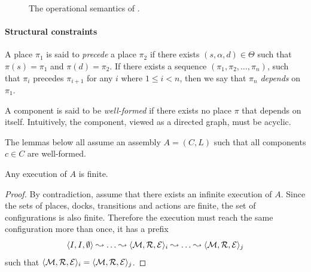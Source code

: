 {\begin{figure}[tp]
  \caption{The operational semantics of \mad.}
  \label{fig:rules}
\end{figure}


\paragraph{Structural constraints}{
  A place $\pi_1$ is said to \emph{precede} a place $\pi_2$ if there
  exists $(s, \alpha, d) \in \Theta$ such that $\pi(s) = \pi_1$ and
  $\pi(d) = \pi_2$.  If there exists a sequence $(\pi_1, \pi_2, \dots,
  \pi_n)$, such that $\pi_{i}$ precedes $\pi_{i+1}$ for any $i$ where
  $1 \le i < n$, then we say that $\pi_n$ \emph{depends} on $\pi_1$.

  A \mad component is said to be \emph{well-formed} if there exists no
  place $\pi$ that depends on itself. Intuitively, the component,
  viewed as a directed graph, must be acyclic.

  The lemmas below all assume an assembly $A = (C, L)$ such that all
  components $c \in C$ are well-formed.

  \begin{lemma}\label{thm:finite}
    Any execution of $A$ is finite.
  \end{lemma}

  \begin{proof}
    By contradiction, assume that there exists an infinite execution
    of $A$. Since the sets of places, docks, transitions and actions
    are finite, the set of configurations is also finite. Therefore
    the execution must reach the same configuration more than once,
    \ie it has a prefix
    \[
    \langle I, I, \emptyset \rangle \semstep \dots \semstep \langle \mk, \reached, \exec \rangle_i \semstep \dots \semstep \langle \mk, \reached, \exec \rangle_j
    \]
    such that $\langle \mathcal{M}, \mathcal{R}, \mathcal{E} \rangle_i = \langle \mathcal{M},
    \mathcal{R}, \mathcal{E} \rangle_j$.


\end{proof}}}
